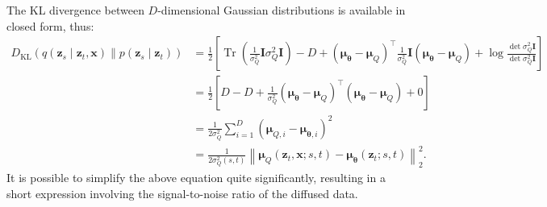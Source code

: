 The KL divergence between $D$-dimensional Gaussian distributions is available in closed form, thus:
%
\begin{align}
    D_{\mathrm{KL}}(q(\mathbf{z}_{s} \mid \mathbf{z}_{t},   \mathbf{x}) \parallel p(\mathbf{z}_{s} \mid \mathbf{z}_{t})) & =
  \frac{1}{2}\left[ \operatorname{Tr}\left(\frac{1}{\sigma_Q^2}\mathbf{I}\sigma_Q^2\mathbf{I}\right)  - D +
    \left(\boldsymbol{\mu}_{\boldsymbol{\theta}} - \boldsymbol{\mu}_Q\right)^\top\frac{1}{\sigma_Q^2}\mathbf{I}\left(\boldsymbol{\mu}_{\boldsymbol{\theta}} - \boldsymbol{\mu}_Q\right) + \log \frac{\det\sigma_Q^2\mathbf{I}}{\det \sigma_Q^2\mathbf{I}}\right]
    \\[5pt]  & =
    \frac{1}{2}\left[D - D +
    \frac{1}{\sigma_Q^2}\left(\boldsymbol{\mu}_{\boldsymbol{\theta}} - \boldsymbol{\mu}_Q\right)^\top\left(\boldsymbol{\mu}_{\boldsymbol{\theta}} - \boldsymbol{\mu}_Q\right) + 0 \right]
    \\[5pt] & = \frac{1}{2\sigma_{Q}^{2}}\sum_{i=1}^D\left(  \boldsymbol{\mu}_{Q,i} - \boldsymbol{\mu}_{\boldsymbol{\theta},i}\right)^2
    \\[5pt] & = \frac{1}{2 \sigma^2_{Q}(s,t)} \left\| \boldsymbol{\mu}_{Q}(\mathbf{z}_t, \mathbf{x}; s, t) - \boldsymbol{\mu}_{\boldsymbol{\theta}}(\mathbf{z}_t; s, t) \right\|^2_2. \label{eq: klqp}
\end{align}
It is possible to simplify the above equation quite significantly, resulting in a short expression involving the signal-to-noise ratio of the diffused data.

